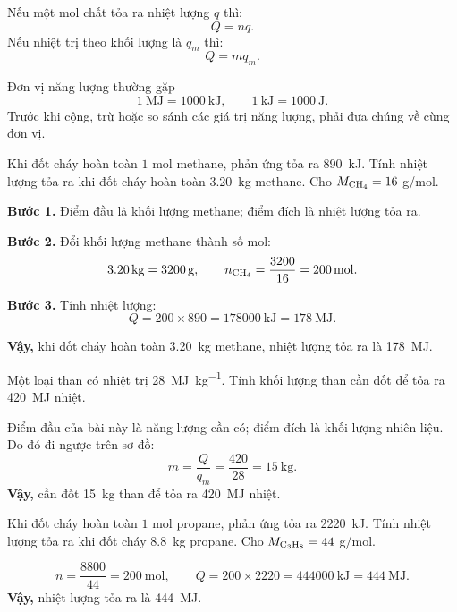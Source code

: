 Nếu một mol chất tỏa ra nhiệt lượng $q$ thì:
\[
Q=nq.
\]
Nếu nhiệt trị theo khối lượng là $q_m$ thì:
\[
Q=mq_m.
\]

\begin{ghinho}{Đơn vị năng lượng thường gặp}
\[
\SI{1}{\mega\joule}=\SI{1000}{\kilo\joule},\qquad
\SI{1}{\kilo\joule}=\SI{1000}{\joule}.
\]
Trước khi cộng, trừ hoặc so sánh các giá trị năng lượng, phải đưa chúng về cùng đơn vị.
\end{ghinho}

\begin{vidu}
Khi đốt cháy hoàn toàn $1$ mol methane, phản ứng tỏa ra \SI{890}{\kilo\joule}. Tính nhiệt lượng tỏa ra khi đốt cháy hoàn toàn \SI{3.20}{\kilo\gram} methane. Cho $M_{\ce{CH4}}=16$ g/mol.
\end{vidu}
\begin{loigiai}
\textbf{Bước 1.} Điểm đầu là khối lượng methane; điểm đích là nhiệt lượng tỏa ra.

\textbf{Bước 2.} Đổi khối lượng methane thành số mol:
\[
\SI{3.20}{\kilo\gram}=\SI{3200}{\gram},\qquad
n_{\ce{CH4}}=\frac{3200}{16}=\SI{200}{\mole}.
\]

\textbf{Bước 3.} Tính nhiệt lượng:
\[
Q=200\times890=\SI{178000}{\kilo\joule}=\SI{178}{\mega\joule}.
\]

\textbf{Vậy,} khi đốt cháy hoàn toàn \SI{3.20}{\kilo\gram} methane, nhiệt lượng tỏa ra là \SI{178}{\mega\joule}.
\end{loigiai}

\begin{vidu}
Một loại than có nhiệt trị \SI{28}{\mega\joule\per\kilo\gram}. Tính khối lượng than cần đốt để tỏa ra \SI{420}{\mega\joule} nhiệt.
\end{vidu}
\begin{loigiai}
Điểm đầu của bài này là năng lượng cần có; điểm đích là khối lượng nhiên liệu. Do đó đi ngược trên sơ đồ:
\[
m=\frac{Q}{q_m}=\frac{420}{28}=\SI{15}{\kilo\gram}.
\]
\textbf{Vậy,} cần đốt \SI{15}{\kilo\gram} than để tỏa ra \SI{420}{\mega\joule} nhiệt.
\end{loigiai}

\begin{tuluyen}
Khi đốt cháy hoàn toàn $1$ mol propane, phản ứng tỏa ra \SI{2220}{\kilo\joule}. Tính nhiệt lượng tỏa ra khi đốt cháy \SI{8.8}{\kilo\gram} propane. Cho $M_{\ce{C3H8}}=44$ g/mol.
\begin{loigiaiBT}
\[
n=\frac{8800}{44}=\SI{200}{\mole},\qquad
Q=200\times2220=\SI{444000}{\kilo\joule}=\SI{444}{\mega\joule}.
\]
\textbf{Vậy,} nhiệt lượng tỏa ra là \SI{444}{\mega\joule}.
\end{loigiaiBT}
\end{tuluyen}
